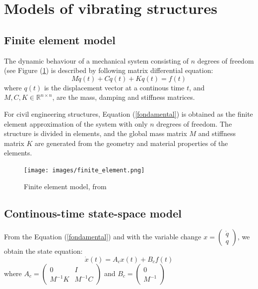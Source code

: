 \documentclass[journal]{IEEEtran}
\begin{document}
\section{Models of vibrating structures}%

\subsection{Finite element model}

The dynamic behaviour of a mechanical system consisting of $n$ degrees of freedom (see Figure (\ref{finite_el}) is described by following matrix differential equation:
\begin{equation}
M \ddot{q}(t) + C \dot{q}(t) + K q(t) = f(t)
\label{fondamental}
\end{equation}
where $q(t)$ is the displacement vector at a continous time $t$, and $M, C, K \in \mathbb{R}^{n \times n}$, are the mass, damping and stiffness matrices. 

For civil engineering structures, Equation (\ref{fondamental}) is obtained as the finite element approximation of the system with only $n$ dregrees of freedom.
The structure is divided in elements, and the global mass matrix $M$ and stiffness matrix $K$ are generated from the geometry and material
properties of the elements.

\begin{figure}
  \centering
  \texttt{[image: images/finite\_element.png]}
  \caption{Finite element model, from \cite{peeters2000system}}
  \label{finite_el}
\end{figure}


\subsection{Continous-time state-space model} %

From the Equation (\ref{fondamental}) and with the variable change $x =
\begin{pmatrix}
\dot{q} \\
q
\end{pmatrix}$, we obtain the state equation:
\begin{equation}
\dot{x}(t) = A_cx(t) + B_cf(t)
\end{equation}
 where
$A_c =
\begin{pmatrix}
0 & I \\
M^{-1}K & M^{-1}C
\end{pmatrix}$
and
$B_c=
\begin{pmatrix}
0 \\
M^{-1}
\end{pmatrix}$
\end{document}
